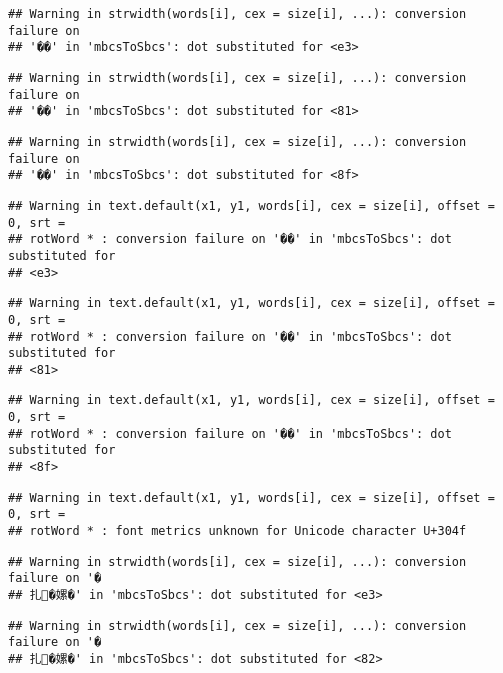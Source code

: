 \documentclass[]{article}
\begin{document}
\begin{verbatim}
## Warning in strwidth(words[i], cex = size[i], ...): conversion failure on
## '��' in 'mbcsToSbcs': dot substituted for <e3>
\end{verbatim}

\begin{verbatim}
## Warning in strwidth(words[i], cex = size[i], ...): conversion failure on
## '��' in 'mbcsToSbcs': dot substituted for <81>
\end{verbatim}

\begin{verbatim}
## Warning in strwidth(words[i], cex = size[i], ...): conversion failure on
## '��' in 'mbcsToSbcs': dot substituted for <8f>
\end{verbatim}

\begin{verbatim}
## Warning in text.default(x1, y1, words[i], cex = size[i], offset = 0, srt =
## rotWord * : conversion failure on '��' in 'mbcsToSbcs': dot substituted for
## <e3>
\end{verbatim}

\begin{verbatim}
## Warning in text.default(x1, y1, words[i], cex = size[i], offset = 0, srt =
## rotWord * : conversion failure on '��' in 'mbcsToSbcs': dot substituted for
## <81>
\end{verbatim}

\begin{verbatim}
## Warning in text.default(x1, y1, words[i], cex = size[i], offset = 0, srt =
## rotWord * : conversion failure on '��' in 'mbcsToSbcs': dot substituted for
## <8f>
\end{verbatim}

\begin{verbatim}
## Warning in text.default(x1, y1, words[i], cex = size[i], offset = 0, srt =
## rotWord * : font metrics unknown for Unicode character U+304f
\end{verbatim}

\begin{verbatim}
## Warning in strwidth(words[i], cex = size[i], ...): conversion failure on '�
## 扎�嫘�' in 'mbcsToSbcs': dot substituted for <e3>
\end{verbatim}

\begin{verbatim}
## Warning in strwidth(words[i], cex = size[i], ...): conversion failure on '�
## 扎�嫘�' in 'mbcsToSbcs': dot substituted for <82>
\end{verbatim}
\end{document}

